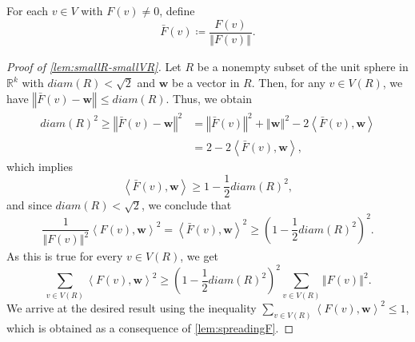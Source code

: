 \documentclass[12pt,a4paper,bold]{thesis}
\theoremstyle{definition}
\newcommand*{\ip}[2]{\left\langle #1 , #2 \right\rangle}
\newcommand*{\norm}[2][]{\left\Vert #2 \right\Vert_{#1}}
\begin{document}
For each $v \in V$ with $F(v) \neq 0$, define 
\begin{equation*}
    \bar{F}(v) \coloneq \frac{F(v)}{\norm{F(v)}}. 
\end{equation*}

\begin{proof}[Proof of \cref{lem:smallR-smallVR}]
    Let $R$ be a nonempty subset of the unit sphere in $\mathbb{R}^k$ with 
    $diam(R) < \sqrt{2}$ and $\mathbf{w}$ be a vector in $R$. Then, for any $v \in V(R)$,
    we have $\norm{\bar{F}(v) - \mathbf{w}} \leq diam(R)$. Thus, we obtain
    \begin{align*}
        diam(R)^2 \geq \norm{\bar{F}(v) - \mathbf{w}}^2 
        & = 
		\norm{\bar{F}(v)}^2 + \norm{\mathbf{w}}^2 - 2 \ip{\bar{F}(v)}{\mathbf{w}}
		\\
        & = 
		2 - 2 \ip{\bar{F}(v)}{\mathbf{w}},
    \end{align*}
    which implies 
    \begin{equation*}
        \ip{\bar{F}(v)}{\mathbf{w}} \geq 1 - \frac{1}{2} diam(R)^2,
    \end{equation*}
    and since $diam(R) < \sqrt{2}$, we conclude that  
    \begin{equation*}
        \frac{1}{\norm{F(v)}^2} \ip{F(v)}{\mathbf{w}}^2 
        = \ip{\bar{F}(v)}{\mathbf{w}}^2 \geq \left(1 - \frac{1}{2} diam(R)^2\right)^2.
    \end{equation*} 
    As this is true for every $v \in V(R)$, we get
    \begin{equation*}
        \sum_{v \in V(R)} \ip{F(v)}{\mathbf{w}}^2 \geq \left(1 - \frac{1}{2} diam(R)^2\right)^2
        \sum_{v \in V(R)} \norm{F(v)}^2.
    \end{equation*} 
    We arrive at the desired result using the inequality
    $\sum_{v \in V(R)} \ip{F(v)}{\mathbf{w}}^2 \leq 1$, 
	which is obtained as a consequence of \cref{lem:spreadingF}.
    \end{proof}
\end{document}
